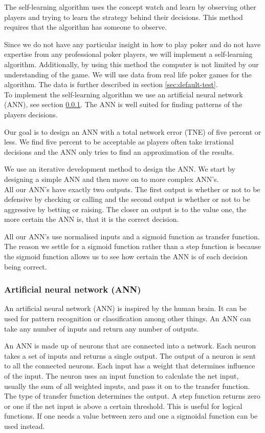 The self-learning algorithm uses the concept watch and learn by observing other players and trying to learn the strategy behind their decisions. This method requires that the algorithm has someone to observe.

Since we do not have any particular insight in how to play poker and do not have expertise from any professional poker players, we will implement a self-learning algorithm. Additionally, by using this method the computer is not limited by our understanding of the game. We will use data from real life poker games for the algorithm. The data is further described in section \ref{sec:default-test}.\\

To implement the self-learning algorithm we use an artificial neural network (ANN), see section \ref{sec:nn}. The ANN is well suited for finding patterns of the players decisions. 

Our goal is to design an ANN with a total network error (TNE) of five percent or less. We find five percent to be acceptable as players often take irrational decisions and the ANN only tries to find an approximation of the results. 

We use an iterative development method to design the ANN. We start by designing a simple ANN and then move on to more complex ANN's.\\

All our ANN's have exactly two outputs. The first output is whether or not to be defensive by checking or calling and the second output is whether or not to be aggressive by betting or raising. The closer an output is to the value one, the more certain the ANN is, that it is the correct decision. 

All our ANN's use normalised inputs and a sigmoid function as transfer function. The reason we settle for a sigmoid function rather than a step function is because the sigmoid function allows us to see how certain the ANN is of each decision being correct.

\subsubsection{Artificial neural network (ANN)}
\label{sec:nn}
An artificial neural network (ANN) is inspired by the human brain. It can be used for pattern recognition or classification among other things. An ANN can take any number of inputs and return any number of outputs. 

An ANN is made up of neurons that are connected into a network. Each neuron takes a set of inputs and returns a single output. The output of a neuron is sent to all the connected neurons. Each input has a weight that determines influence of the input. The neuron uses an input function to calculate the net input, usually the sum of all weighted inputs, and pass it on to the transfer function. The type of transfer function determines the output. A step function returns zero or one if the net input is above a certain threshold. This is useful for logical functions. If one needs a value between zero and one a sigmoidal function can be used instead.

